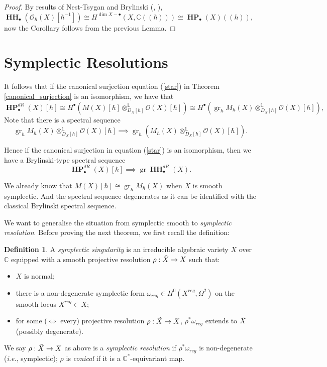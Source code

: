 \documentclass[draft]{article}
\theoremstyle{definition}
\newtheorem{definition}[theorem]{Definition}
\DeclareMathOperator{\gr}{gr}
\DeclareMathOperator{\HH}{\mathbf{HH}}
\DeclareMathOperator{\HP}{\mathbf{HP}}
\begin{document}
\begin{proof}
By results of Nest-Tsygan and Brylinski (\cite[Theorem A2.1]{Algebraic_index_theorem}, \cite{A_differential_complex_for_Poisson_manifolds}), $\HH_\bullet(\mathcal{O}_\hbar(X)[\hbar^{-1}])\cong H^{\dim X-\bullet}(X,\mathbb{C}((\hbar)))\cong \HP_\bullet(X)((h))$, now the Corollary follows from the previous Lemma.
\end{proof}



\section{Symplectic Resolutions}\label{Symplectic_Resolutions}
It follows that if the canonical surjection equation (\ref{star}) in Theorem \ref{canonical_surjection} is an isomorphism, we have that $$\HP^{dR}_\bullet(X)[\hbar]\cong H^\bullet(M(X)[\hbar]\otimes^{\mathbb{L}}_{D_X[\hbar]}\mathcal{O}(X)[\hbar])\cong H^\bullet(\gr_\hbar M_\hbar(X)\otimes^{\mathbb{L}}_{D_X[\hbar]}\mathcal{O}(X)[\hbar]),$$ Note that there is a spectral sequence $$\gr_\hbar M_\hbar(X)\otimes^{\mathbb{L}}_{D_X[\hbar]}\mathcal{O}(X)[\hbar]\implies \gr_\hbar (M_\hbar(X)\otimes^{\mathbb{L}}_{D_X[\hbar]}\mathcal{O}(X)[\hbar]).$$

Hence if the canonical surjection in equation (\ref{star}) is an isomorphism, then we have a Brylinski-type spectral sequence $$\HP^{dR}_\bullet(X)[\hbar]\implies \gr \HH^{dR}_\bullet(X).$$

We already know that $M(X)[\hbar]\cong\gr_\hbar M_{\hbar}(X)$ when $X$ is smooth symplectic. And the spectral sequence degenerates as it can be identified with the classical Brylinski spectral sequence. 

We want to generalise the situation from symplectic smooth to \textit{symplectic resolution}. Before proving the next theorem, we first recall the definition:

\begin{definition}
A \textit{symplectic singularity} is an irreducible algebraic variety $X$ over $\mathbb{C}$ equipped with a smooth projective resolution $\rho:\Tilde{X}\to X$ such that:
\begin{itemize}
    \item $X$ is normal;
    \item there is a non-degenerate symplectic form $\omega_{reg} \in H^0(X^{reg}, \Omega^2)$ on the smooth locus $X^{reg}\subset X$;
    \item for some ($\iff$ every) projective resolution $\rho:\Tilde{X}\to X$, $\rho^*\omega_{reg}$ extends to $\Tilde{X}$ (possibly degenerate). 
\end{itemize}
We say $\rho:\Tilde{X}\to X$ as above is a \textit{symplectic resolution} if $\rho^*\omega_{reg}$ is non-degenerate (\textit{i.e.}, symplectic); $\rho$ is \textit{conical} if it is a $\mathbb{C}^*$-equivariant map.
\end{definition}
\end{document}
